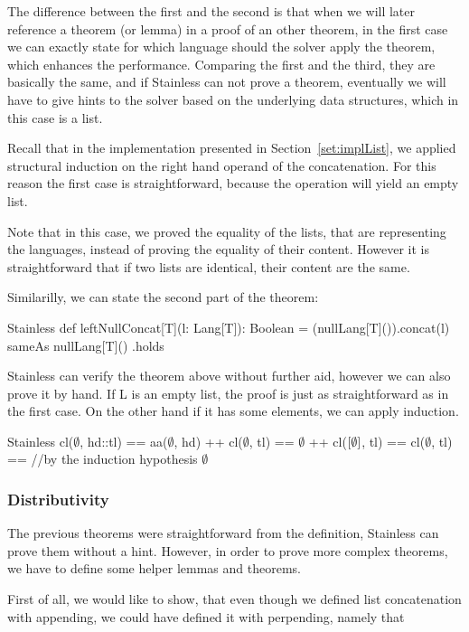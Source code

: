 The difference between the first and the second is that when we will later reference a theorem (or lemma) in a proof of an other theorem, in the first case we can exactly state for which language should the solver apply the theorem, which enhances the performance. Comparing the first and the third, they are basically the same, and if Stainless can not prove a theorem, eventually we will have to give hints to the solver based on the underlying data structures, which in this case is a list.

Recall that in the implementation presented in Section~\ref{set:implList}, we applied structural induction on the right hand operand of the concatenation. For this reason the first case is straightforward, because the operation will yield an empty list. 

Note that in this case, we proved the equality of the lists, that are representing the languages, instead of proving the equality of their content. However it is straightforward that if two lists are identical, their content are the same.

Similarilly, we can state the second part of the theorem:

\begin{ShortCode}{Stainless}
 def leftNullConcat[T](l: Lang[T]): Boolean = {
   (nullLang[T]()).concat(l) sameAs nullLang[T]()
 }.holds	
\end{ShortCode}

Stainless can verify the theorem above without further aid, however we can also prove it by hand. If L is an empty list, the proof is just as straightforward as in the first case. On the other hand if it has some elements, we can apply induction.

\begin{ShortCode}{Stainless}
 cl($\emptyset$, hd::tl) ==
 aa($\emptyset$, hd) ++ cl($\emptyset$, tl) ==
 $\emptyset$ ++ cl($[\emptyset]$, tl) ==
 cl($\emptyset$, tl) == //by the induction hypothesis
 $\emptyset$
\end{ShortCode}

\subsubsection{Distributivity}

The previous theorems were straightforward from the definition, Stainless can prove them without a hint. However, in order to prove more complex theorems, we have to define some helper lemmas and theorems.

First of all, we would like to show, that even though we defined list concatenation with appending, we could have defined it with perpending, namely that 

